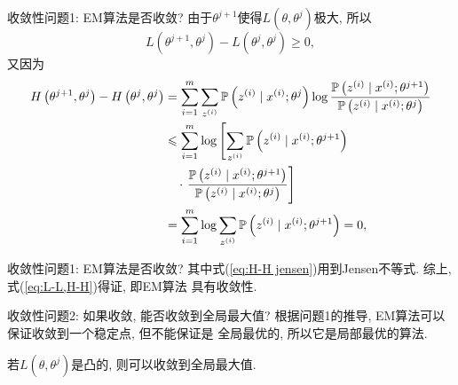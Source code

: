 \documentclass[UTF8]{ctexbeamer}
\renewcommand{\P}{\mathbb{P}}
\begin{document}
    \begin{frame}{收敛性}{问题1: EM算法是否收敛?}
        由于$\theta^{j+1}$使得$L(\theta,\theta^j)$极大, 所以 
        \begin{equation*}
            L\left(\theta^{j+1},\theta^j\right)-L\left(\theta^j,\theta^j\right)\geqslant 0,
        \end{equation*}
        又因为 
        \vspace*{-1pt}
        \begin{align}
            H\left(\theta^{j+1},\theta^j\right)-H\left(\theta^j,\theta^j\right)&=\sum_{i=1}^m\sum_{z^{(i)}}\P\left(z^{(i)}\mid x^{(i)};\theta^j\right)\log\frac{\P\left(z^{(i)}\mid x^{(i)};\theta^{j+1}\right)}{\P\left(z^{(i)}\mid x^{(i)};\theta^j\right)}\notag\\
            &\leqslant \sum_{i=1}^m\log\left[\sum_{z^{(i)}}\P\left(z^{(i)}\mid x^{(i)};\theta^{j+1}\right)\right.\notag\\
            &\quad\cdot \left.\frac{\P\left(z^{(i)}\mid x^{(i)};\theta^{j+1}\right)}{\P\left(z^{(i)}\mid x^{(i)};\theta^j\right)}\right]\label{eq:H-H jensen}\\
            &=\sum_{i=1}^m\log\sum_{z^{(i)}}\P\left(z^{(i)}\mid x^{(i)};\theta^{j+1}\right)=0,\notag
        \end{align}
    \end{frame}

    \begin{frame}{收敛性}{问题1: EM算法是否收敛?}
        其中式(\ref{eq:H-H jensen})用到Jensen不等式. 综上, 式(\ref{eq:L-L,H-H})得证, 即EM算法
        具有收敛性.
    \end{frame}

    \begin{frame}{收敛性}{问题2: 如果收敛, 能否收敛到全局最大值?}
        根据问题1的推导, EM算法可以保证收敛到一个稳定点, 但不能保证是
        全局最优的, 所以它是局部最优的算法. 

        若$L(\theta,\theta^j)$是凸的, 则可以收敛到全局最大值.
    \end{frame}
\end{document}
